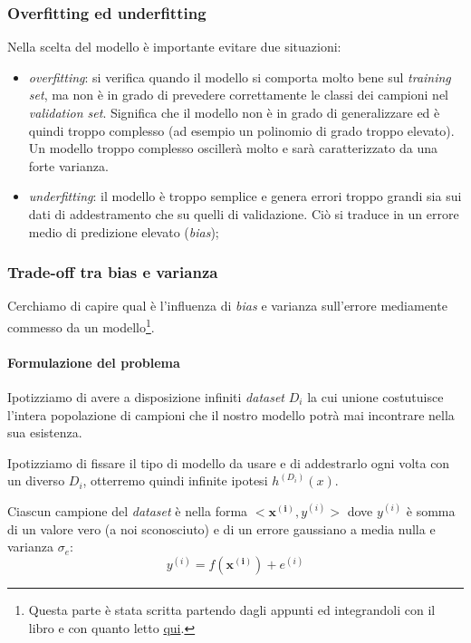 \subsubsection{Overfitting ed underfitting}
Nella scelta del modello è importante evitare due situazioni:
\begin{itemize}
\item \emph{overfitting}: si verifica quando il modello si comporta molto bene sul \emph{training set}, ma non è in grado di prevedere correttamente le classi dei campioni nel \emph{validation set}. Significa che il modello non è in grado di generalizzare ed è quindi troppo complesso (ad esempio un polinomio di grado troppo elevato). Un modello troppo complesso oscillerà molto e sarà caratterizzato da una forte varianza.
\item \emph{underfitting}: il modello è troppo semplice e genera errori troppo grandi sia sui dati di addestramento che su quelli di validazione. Ciò si traduce in un errore medio di predizione elevato (\emph{bias});
\end{itemize}

\subsubsection{Trade-off tra bias e varianza}
Cerchiamo di capire qual è l'influenza di \emph{bias} e varianza sull'errore mediamente commesso da un modello\footnote{Questa parte è stata scritta partendo dagli appunti ed integrandoli con il libro e con quanto letto \href{http://www-scf.usc.edu/~csci567/17-18-bias-variance.pdf}{qui}.}.

\paragraph{Formulazione del problema}
Ipotizziamo di avere a disposizione infiniti \emph{dataset} $D_i$ la cui unione costutuisce l'intera popolazione di campioni che il nostro modello potrà mai incontrare nella sua esistenza.

Ipotizziamo di fissare il tipo di modello da usare e di addestrarlo ogni volta con un diverso $D_i$, otterremo quindi infinite ipotesi $h^{(D_i)}(x)$.

Ciascun campione del \emph{dataset} è nella forma $<\mathbf{x^{(i)}}, y^{(i)}>$ dove $y^{(i)}$ è somma di un valore vero (a noi sconosciuto) e di un errore gaussiano a media nulla e varianza $\sigma_e$:
\begin{equation*}
y^{(i)}=f(\mathbf{x^{(i)}})+e^{(i)}
\end{equation*}


